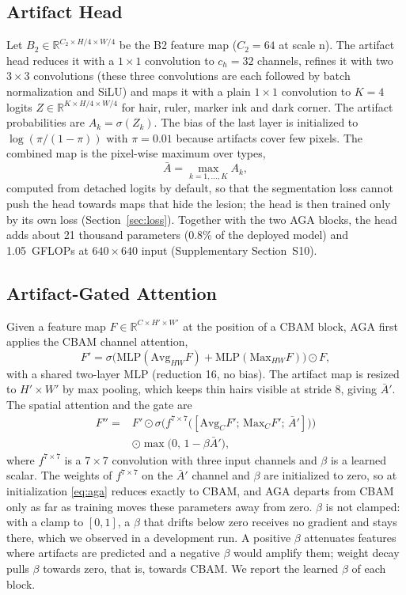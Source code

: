 \subsection{Artifact Head}
Let $B_2\in\mathbb{R}^{C_2\times H/4\times W/4}$ be the B2 feature map ($C_2=64$ at scale n). The artifact head reduces it with a $1\times1$ convolution to $c_h=32$ channels, refines it with two $3\times3$ convolutions (these three convolutions are each followed by batch normalization and SiLU) and maps it with a plain $1\times1$ convolution to $K=4$ logits $Z\in\mathbb{R}^{K\times H/4\times W/4}$ for hair, ruler, marker ink and dark corner. The artifact probabilities are $A_k=\sigma(Z_k)$. The bias of the last layer is initialized to $\log(\pi/(1-\pi))$ with $\pi=0.01$ because artifacts cover few pixels. The combined map is the pixel-wise maximum over types,
\begin{equation}
\bar{A}=\max_{k=1,\dots,K} A_k ,
\label{eq:abar}
\end{equation}
computed from detached logits by default, so that the segmentation loss cannot push the head towards maps that hide the lesion; the head is then trained only by its own loss (Section~\ref{sec:loss}). Together with the two AGA blocks, the head adds about 21 thousand parameters (0.8\% of the deployed model) and 1.05~GFLOPs at $640\times640$ input (Supplementary Section~S10).

\subsection{Artifact-Gated Attention}
Given a feature map $F\in\mathbb{R}^{C\times H'\times W'}$ at the position of a CBAM block, AGA first applies the CBAM channel attention,
\begin{equation}
F'=\sigma\big(\mathrm{MLP}(\mathrm{Avg}_{HW}F)+\mathrm{MLP}(\mathrm{Max}_{HW}F)\big)\odot F,
\label{eq:ca}
\end{equation}
with a shared two-layer MLP (reduction 16, no bias). The artifact map is resized to $H'\times W'$ by max pooling, which keeps thin hairs visible at stride 8, giving $\bar{A}'$. The spatial attention and the gate are
\begin{equation}
\begin{aligned}
F''={}&F'\odot\sigma\Big(f^{7\times7}\big([\mathrm{Avg}_C F';\,\mathrm{Max}_C F';\,\bar{A}']\big)\Big)\\
&\odot\max\big(0,\,1-\beta\bar{A}'\big),
\end{aligned}
\label{eq:aga}
\end{equation}
where $f^{7\times7}$ is a $7\times7$ convolution with three input channels and $\beta$ is a learned scalar. The weights of $f^{7\times7}$ on the $\bar{A}'$ channel and $\beta$ are initialized to zero, so at initialization \eqref{eq:aga} reduces exactly to CBAM, and AGA departs from CBAM only as far as training moves these parameters away from zero. $\beta$ is not clamped: with a clamp to $[0,1]$, a $\beta$ that drifts below zero receives no gradient and stays there, which we observed in a development run. A positive $\beta$ attenuates features where artifacts are predicted and a negative $\beta$ would amplify them; weight decay pulls $\beta$ towards zero, that is, towards CBAM. We report the learned $\beta$ of each block.

